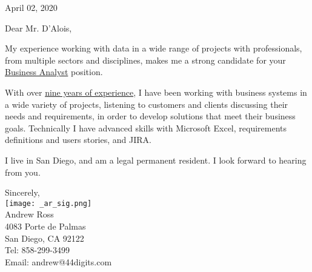 \documentclass[letterpaper]{article}
\newcommand{\CVjobTitle}{Business Analyst}
\newcommand{\impt}[1]{\uline{#1}}
\begin{document}
\large

\null\hfill April 02, 2020
\vspace{1em}

Dear Mr. D'Alois,

My experience working with data in a wide range of
projects with professionals, from multiple sectors and disciplines, makes me a
strong candidate for your \impt{\CVjobTitle} position.

With over \impt{nine years of experience}, I have been working with business
systems in a wide variety of projects, listening to customers and clients
discussing their needs and requirements, in order to develop solutions that
meet their business goals.
Technically I have advanced skills with Microsoft Excel, requirements
definitions and users stories, and JIRA.

I live in San Diego, and am a legal permanent resident.  
I look forward to hearing from you.  



Sincerely,\\
\hspace{1em} \texttt{[image: \_ar\_sig.png]} \\
Andrew Ross \\
\small
4083 Porte de Palmas \\
San Diego, CA  92122 \\
Tel: 858-299-3499 \\
Email: andrew@44digits.com
\end{document}
